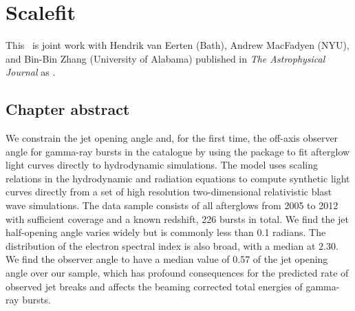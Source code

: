 \renewcommand{\chapid}{scalefit}


\newcommand{\multinest}{\texttt{MultiNest}}
\newcommand{\afterglowlibrary}{{\texttt{http://cosmo.nyu.edu/afterglowlibrary/}}}


\newcommand{\ddl}{d_{L,28}}
\newcommand{\Eiso}{E_{iso}}
\newcommand{\Edl}{E_{iso, 53}}
\newcommand{\ndl}{n_{0, 0}}
\newcommand{\thO}{\theta_0}
\newcommand{\thobs}{\theta_{obs}}
\newcommand{\epse}{\epsilon_e}
\newcommand{\epsB}{\epsilon_B}
\newcommand{\xN}{\xi_N}
\newcommand{\tobs}{t_{obs}}
\newcommand{\Fp}{F_{peak}}
\newcommand{\cf}{\mathfrak{f}}
\newcommand{\cfp}{\cf_{peak}}
\newcommand{\cfm}{\cf_{m}}
\newcommand{\cfc}{\cf_{c}}
\chapter{Scalefit }

This \paper\ is joint work with Hendrik van Eerten (Bath), Andrew MacFadyen (NYU), and Bin-Bin Zhang (University of Alabama) published in \emph{The Astrophysical Journal} as \citet{Ryan15}.

\section{Chapter abstract}

We constrain the jet opening angle and, for the first time, the off-axis observer angle for gamma-ray bursts in the \swiftXRT{} catalogue by using the \scalefit{} package to fit afterglow light curves directly to hydrodynamic simulations.
The \scalefit{} model uses scaling relations in the hydrodynamic and radiation equations to compute synthetic light curves directly from a set of high resolution two-dimensional relativistic blast wave simulations.  The data sample consists of all \swiftXRT{} afterglows from 2005 to 2012 with sufficient coverage and a known redshift, 226 bursts in total.  We find the jet half-opening angle varies widely but is commonly less than 0.1 radians.  The distribution of the electron spectral index is also broad, with a median at $2.30$. 
We find the observer angle to have a median value of 0.57 of the jet opening angle over our sample, which has profound consequences for the predicted rate of observed jet breaks and affects the beaming corrected total energies of gamma-ray bursts.


